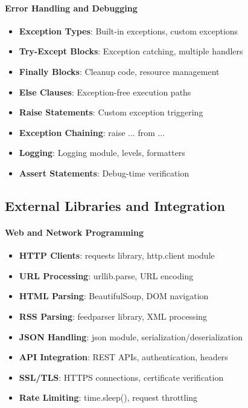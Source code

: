 \paragraph{Error Handling and Debugging \starfull\starfull\starfull\starfull\starempty}
\begin{itemize}
\item[\checkmark] \textbf{Exception Types}: Built-in exceptions, custom exceptions
\item[\checkmark] \textbf{Try-Except Blocks}: Exception catching, multiple handlers
\item[\checkmark] \textbf{Finally Blocks}: Cleanup code, resource management
\item[\checkmark] \textbf{Else Clauses}: Exception-free execution paths
\item[\checkmark] \textbf{Raise Statements}: Custom exception triggering
\item[\checkmark] \textbf{Exception Chaining}: raise ... from ...
\item[\checkmark] \textbf{Logging}: Logging module, levels, formatters
\item[\checkmark] \textbf{Assert Statements}: Debug-time verification
\end{itemize}

\subsection{External Libraries and Integration}

\paragraph{Web and Network Programming \starfull\starfull\starfull\starfull\starempty}
\begin{itemize}
\item[\checkmark] \textbf{HTTP Clients}: requests library, http.client module
\item[\checkmark] \textbf{URL Processing}: urllib.parse, URL encoding
\item[\checkmark] \textbf{HTML Parsing}: BeautifulSoup, DOM navigation
\item[\checkmark] \textbf{RSS Parsing}: feedparser library, XML processing
\item[\checkmark] \textbf{JSON Handling}: json module, serialization/deserialization
\item[\checkmark] \textbf{API Integration}: REST APIs, authentication, headers
\item[\checkmark] \textbf{SSL/TLS}: HTTPS connections, certificate verification
\item[\checkmark] \textbf{Rate Limiting}: time.sleep(), request throttling
\end{itemize}


